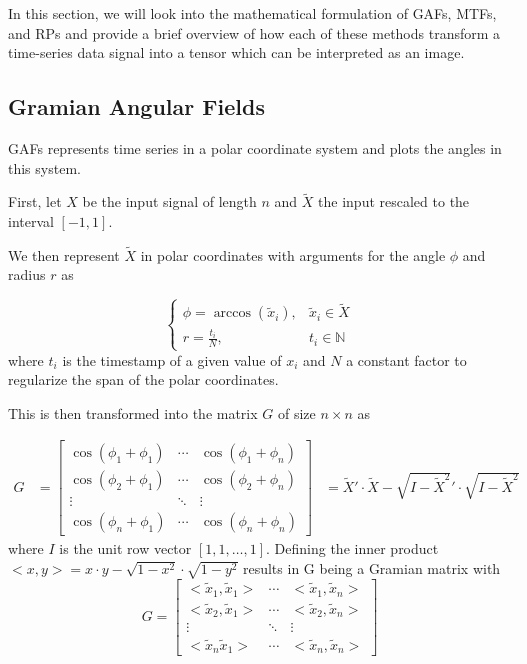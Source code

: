 In this section, we will look into the mathematical formulation of GAFs, MTFs, and RPs and provide a brief overview of how each of these methods transform a time-series data signal into a tensor which can be interpreted as an image.

\subsection{Gramian Angular Fields}

GAFs \cite{wang2015imaging} represents time series in a polar coordinate system and plots the angles in this system.

First, let $X$ be the input signal of length $n$ and $\tilde{X}$ the input rescaled to the interval $[-1, 1]$.

We then represent $\tilde{X}$ in polar coordinates with arguments for the angle $\phi$ and radius $r$ as

\begin{equation}
	\begin{cases}
		\phi = \arccos(\tilde{x}_i), & \tilde{x}_i \in \tilde{X} \\
		r = \frac{t_i}{N}, & t_{i} \in \mathbb{N}
	\end{cases}
\end{equation}
where $t_{i}$ is the timestamp of a given value of $x_i$ and $N$ a constant factor to regularize the span of the polar coordinates.

This is then transformed into the matrix $G$ of size $n \times n$ as

\begin{align}
	G &= \begin{bmatrix}
		\cos(\phi_1 + \phi_1) & \cdots & \cos(\phi_1 + \phi_n) \\
		\cos(\phi_2 + \phi_1) & \cdots & \cos(\phi_2 + \phi_n) \\
		\vdots                & \ddots & \vdots \\
		\cos(\phi_n + \phi_1) & \cdots & \cos(\phi_n + \phi_n)
	\end{bmatrix}
	&= \tilde{X}' \cdot \tilde{X} - \sqrt{I - \tilde{X}^2}' \cdot \sqrt{I - \tilde{X}^2}
\end{align}
where $I$ is the unit row vector $[1, 1, \ldots, 1]$.
Defining the inner product $< x,y> = x \cdot y - \sqrt{1 - x^2} \cdot \sqrt{1-y^2}$ results in G being a Gramian matrix with
\begin{equation}
	G = \begin{bmatrix}
		< \tilde{x}_1, \tilde{x}_1 > & \cdots & < \tilde{x}_1, \tilde{x}_n >\\
		< \tilde{x}_2, \tilde{x}_1 > & \cdots & < \tilde{x}_2, \tilde{x}_n > \\
		\vdots                       & \ddots & \vdots \\
		< \tilde{x}_n \tilde{x}_1 > & \cdots & < \tilde{x}_n, \tilde{x}_n >
	\end{bmatrix}
\end{equation}

